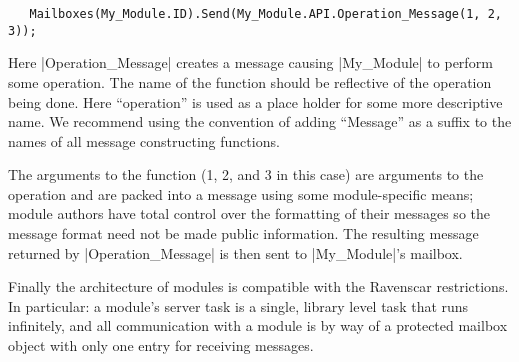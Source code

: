 \begin{lstlisting}
   Mailboxes(My_Module.ID).Send(My_Module.API.Operation_Message(1, 2, 3));
\end{lstlisting}

Here |Operation_Message| creates a message causing |My_Module| to perform some operation. The
name of the function should be reflective of the operation being done. Here ``operation'' is
used as a place holder for some more descriptive name. We recommend using the convention of
adding ``Message'' as a suffix to the names of all message constructing functions.

The arguments to the function (1, 2, and 3 in this case) are arguments to the operation and are
packed into a message using some module-specific means; module authors have total control over
the formatting of their messages so the message format need not be made public information.
 The resulting
message returned by |Operation_Message| is then sent to |My_Module|'s mailbox.

Finally the architecture of modules is compatible with the Ravenscar restrictions. In
particular: a module's server task is a single, library level task that runs infinitely, and all
communication with a module is by way of a protected mailbox object with only one entry for
receiving messages.
